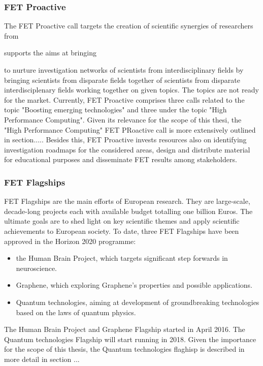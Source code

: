 \subsubsection{FET Proactive}
The FET Proactive call targets the creation of scientific synergies of researchers from 

supports the aims at bringing 

to nurture investigation networks of scientists from interdisciplinary fields by bringing scientists from disparate fields together  of scientists from disparate interdisciplenary fields working together on given topics. The topics are not ready for the market. Currently, FET Proactive comprises three calls related to the topic "Boosting emerging technologies" and three under the topic "High Performance Computing". Given its relevance for the scope of this thesi, the "High Performance Computing" FET PRoactive call is more extensively outlined in section..... Besides this, FET Proactive invests resources also on identifying investigation roadmaps for the considered areas, design and distribute material for educational purposes and disseminate FET results among stakeholders.  

\subsubsection{FET Flagships}
FET Flagships are the main efforts of European research. They are large-scale, decade-long projects each with available budget totalling one billion Euros. The ultimate goals are to shed light on key scientific themes and apply scientific achievements to European society. To date, three FET Flagships have been approved in the Horizon 2020 programme: 

\begin{itemize}
 \item the Human Brain Project, which targets significant step forwards in neuroscience.
 \item Graphene, which exploring Graphene's properties and possible applications.
 \item Quantum technologies, aiming at development of groundbreaking technologies based on the laws of quantum physics.
\end{itemize}
The Human Brain Project and Graphene Flagship started in April 2016. The Quantum technologies Flagship will start running in 2018. Given the importance for the scope of this thesis, the Quantum technologies flaghisp is described in more detail in section ...
